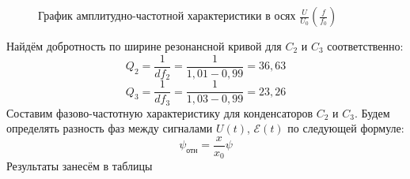 \begin{figure}[H]
	\caption{\centering График амплитудно-частотной характеристики в осях $\frac{U}{U_0} (\frac{f}{f_0})$}
	\label{fig:image2}
\end{figure}
Найдём добротность по ширине резонансной кривой для $C_2$ и $C_3$ соответственно:
\begin{equation}
    Q_2 = \frac{1}{df_2} = \frac{1}{1,01-0,99} = 36,63
\end{equation}
\begin{equation}
    Q_3 = \frac{1}{df_3} = \frac{1}{1,03-0,99} = 23,26
\end{equation}
\n\n
Составим фазово-частотную характеристику для конденсаторов $C_2$ и $C_3$. Будем определять разность фаз между сигналами $U(t)$, $\mathcal{E}(t)$ по следующей формуле:
\begin{equation}
    \psi_{\text{отн}} = \frac{x}{x_0} \psi
\end{equation}
Результаты занесём в таблицы
